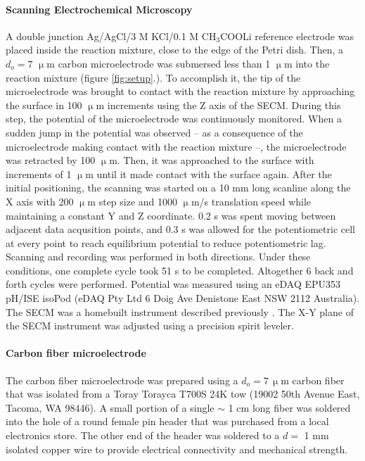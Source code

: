 \documentclass[3p, twocolumn]{elsarticle}
\begin{document}
\paragraph{Scanning Electrochemical Microscopy} A double junction Ag/AgCl/3 M KCl/0.1 M CH$_3$COOLi reference electrode was placed inside the reaction mixture, close to the edge of the Petri dish.
Then, a $d_o=7$ $\upmu$m carbon microelectrode was submersed less than 1 $\upmu$m into the reaction mixture (figure \ref{fig:setup}.).
To accomplish it, the tip of the microelectrode was brought to contact with the reaction mixture by approaching the surface in 100 $\upmu$m increments using the Z axis of the SECM.
During this step, the potential of the microelectrode was continuously monitored.
When a sudden jump in the potential was observed -- as a consequence of the microelectrode making contact with the reaction mixture --, the microelectrode was retracted by 100 $\upmu$m.
Then, it was approached to the surface with increments of 1 $\upmu$m until it made contact with the surface again.
After the initial positioning, the scanning was started on a 10 mm long scanline along the X axis with 200 $\upmu$m step size and 1000 $\upmu$m/s translation speed while maintaining a constant Y and Z coordinate.
0.2 s was spent moving between adjacent data acqusition points, and 0.3 s was allowed for the potentiometric cell at every point to reach equilibrium potential to reduce potentiometric lag.
Scanning and recording was performed in both directions.
Under these conditions, one complete cycle took 51 s to be completed.
Altogether 6 back and forth cycles were performed.
Potential was measured using an eDAQ EPU353 pH/ISE isoPod (eDAQ Pty Ltd 6 Doig Ave Denistone East NSW 2112 Australia).
The SECM was a homebuilt instrument described previously \cite{phd}.
The X-Y plane of the SECM instrument was adjusted using a precision spirit leveler.

\paragraph{Carbon fiber microelectrode} The carbon fiber microelectrode was prepared using a $d_o=7\, \upmu$m carbon fiber that was isolated from a Toray Torayca T700S 24K tow (19002 50th Avenue East, Tacoma, WA 98446).
A small portion of a single $\sim$ 1 cm long fiber was soldered into the hole of a round female pin header that was purchased from a local electronics store. 
The other end of the header was soldered to a $d=$ 1 mm isolated copper wire to provide electrical connectivity and mechanical strength. 
\end{document}
